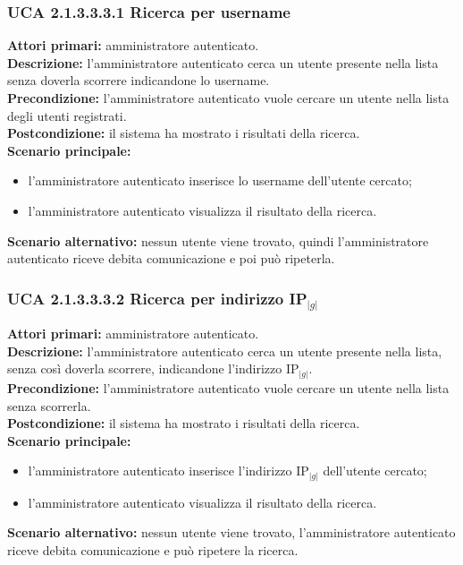 \subsubsection{UCA 2.1.3.3.3.1 Ricerca per username}
\noindent
\textbf{Attori primari:} amministratore autenticato.\\
\textbf{Descrizione:} l'amministratore autenticato cerca un utente presente nella lista senza doverla scorrere indicandone lo username.\\
\textbf{Precondizione:} l'amministratore autenticato vuole cercare un utente nella lista degli utenti registrati.\\
\textbf{Postcondizione:} il sistema ha mostrato i risultati della ricerca.\\
\textbf{Scenario principale:}
\begin{itemize}
\item l'amministratore autenticato inserisce lo username dell'utente cercato;
\item l'amministratore autenticato visualizza il risultato della ricerca.
\end{itemize}
\textbf{Scenario alternativo:} nessun utente viene trovato, quindi l'amministratore autenticato riceve debita comunicazione e poi può ripeterla.

\subsubsection{UCA 2.1.3.3.3.2 Ricerca per indirizzo IP$_{|g|}$}
\noindent
\textbf{Attori primari:} amministratore autenticato.\\
\textbf{Descrizione:} l'amministratore autenticato cerca un utente presente nella lista, senza così doverla scorrere, indicandone l'indirizzo IP$_{|g|}$.\\
\textbf{Precondizione:} l'amministratore autenticato vuole cercare un utente nella lista senza scorrerla.\\
\textbf{Postcondizione:} il sistema ha mostrato i risultati della ricerca.\\
\textbf{Scenario principale:}
\begin{itemize}
\item l'amministratore autenticato inserisce l'indirizzo IP$_{|g|}$ dell'utente cercato;
\item l'amministratore autenticato visualizza il risultato della ricerca.
\end{itemize}
\textbf{Scenario alternativo:} nessun utente viene trovato, l'amministratore autenticato riceve debita comunicazione e può ripetere la ricerca.

